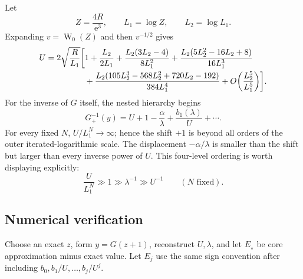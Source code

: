 \documentclass[11pt,oneside]{article}
\theoremstyle{plain}
\theoremstyle{definition}
\theoremstyle{remark}
\newcommand{\W}{\operatorname{W}}
\newcommand{\e}{\mathrm{e}}
\begin{document}
Let
\begin{equation}
 Z=\frac{4R}{\e^3},
 \qquad
 L_1=\log Z,
 \qquad
 L_2=\log L_1.
 \label{eq:barnes-L1-L2}
\end{equation}
Expanding \(v=\W_0(Z)\) and then \(v^{-1/2}\) gives
\begin{align}
 U=2\sqrt{\frac{R}{L_1}}\biggl[{}&1+\frac{L_2}{2L_1}
 +\frac{L_2(3L_2-4)}{8L_1^2}
 +\frac{L_2(5L_2^2-16L_2+8)}{16L_1^3}
 \notag\\
 &+\frac{L_2(105L_2^3-568L_2^2+720L_2-192)}{384L_1^4}
 +O\!\left(\frac{L_2^5}{L_1^5}\right)
 \biggr].
 \label{eq:barnes-U-outer}
\end{align}
For the inverse of \(G\) itself, the nested hierarchy begins
\begin{equation}
 G_+^{-1}(y)
 =U+1-\frac{\alpha}{\lambda}
 +\frac{b_1(\lambda)}{U}+\cdots.
 \label{eq:barnes-full-hierarchy}
\end{equation}
For every fixed \(N\), \(U/L_1^N\to\infty\); hence the shift \(+1\) is
beyond all orders of the outer iterated-logarithmic scale.  The displacement
\(-\alpha/\lambda\) is smaller than the shift but larger than every inverse
power of \(U\).  This four-level ordering is worth displaying explicitly:
\begin{equation}
 \frac{U}{L_1^N}\gg1\gg\lambda^{-1}\gg U^{-1}
 \qquad(N\text{ fixed}).
 \label{eq:barnes-hierarchy}
\end{equation}

\subsection{Numerical verification}
\label{sec:barnes-numerics}

Choose an exact \(z\), form \(y=G(z+1)\), reconstruct \(U,\lambda\), and let
\(E_\star\) be core approximation minus exact value.  Let \(E_j\) use the
same sign convention after including \(b_0,b_1/U,\ldots,b_j/U^j\).
\end{document}
